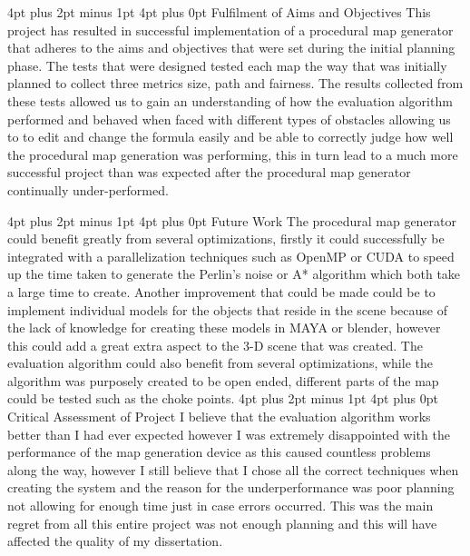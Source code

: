 \documentclass[12pt,a4paper,oneside]{book}
\makeatletter
\renewcommand\section{\@startsection {section}{1}{0mm} %
                               {4pt plus 2pt minus 1pt} %
                               {4pt plus 0pt} %
                               {\bfseries}}
\makeatother
\begin{document}
\section{Fulfilment of Aims and Objectives}
 This project has resulted in successful implementation of a procedural map generator that adheres to the aims and objectives that were set during the initial planning phase. The tests that were designed tested each map the way that was initially planned to collect three metrics size, path and fairness.  
 \vspace{5mm} 
\newline
The results collected from these tests allowed us to gain an understanding of how the evaluation algorithm performed and behaved when faced with different types of obstacles allowing us to to edit and change the formula easily and be able to correctly judge how well the procedural map generation was performing, this in turn lead to a much more successful project than  was expected after the procedural map generator continually under-performed. 

\section{Future Work}
The procedural map generator could benefit greatly from several optimizations, firstly it could successfully be integrated with a parallelization techniques such as OpenMP or CUDA to speed up the time taken to generate the Perlin's noise or A* algorithm which both take a large time to create. 
\vspace{5mm} 
\newline
Another improvement that could be made could be to implement individual models for the objects that reside in the scene because of the lack of knowledge for creating these models in MAYA or blender, however this could add a great extra aspect to the 3-D scene that was created.
\vspace{5mm} 
\newline
The evaluation algorithm could also benefit from several optimizations, while the algorithm was purposely created to be open ended, different parts of the map could be tested such as the choke points.   
\section{Critical Assessment of Project} 
I believe that the evaluation algorithm works better than I had ever expected however I was extremely disappointed with the performance of the map generation device as this caused countless problems along the way, however I still believe that I chose all the correct techniques when creating the system and the reason for the underperformance was poor planning not allowing for enough time just in case errors occurred.  This was the main regret from all  this entire project was not enough planning and this will have affected the quality of my dissertation.
\newpage
\end{document}
